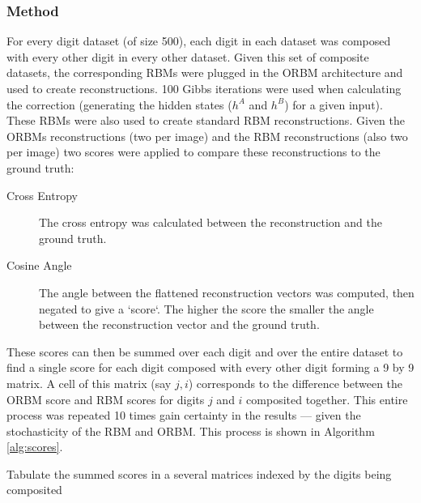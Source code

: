     \subsubsection{Method}

    For every digit dataset (of size 500), each digit in each dataset was composed with every other digit in every other dataset. Given this set of composite datasets, the corresponding RBMs were plugged in the ORBM architecture and used to create reconstructions. 100 Gibbs iterations were used when calculating the correction (generating the hidden states ($h^A$ and $h^B$) for a given input). These RBMs were also used to create standard RBM reconstructions.
    Given the ORBMs reconstructions (two per image) and the RBM reconstructions (also two per image) two scores were applied to compare these reconstructions to the ground truth:
    \begin{description}
      \item[Cross Entropy] The cross entropy was calculated between the reconstruction and the ground truth.
      \item[Cosine Angle] The angle between the flattened reconstruction vectors was computed, then negated to give a `score`. The higher the score the smaller the angle between the reconstruction vector and the ground truth.
    \end{description}
    These scores can then be summed over each digit and over the entire dataset to find a single score for each digit composed with every other digit forming a 9 by 9 matrix. A cell of this matrix (say $j,i$) corresponds to the difference between the ORBM score and RBM scores for digits $j$ and $i$ composited together. This entire process was repeated 10 times gain certainty in the results --- given the stochasticity of the RBM and ORBM. This process is shown in Algorithm \ref{alg:scores}.

    \begin{algorithm}[!ht]

      {
       Tabulate the summed scores in a several matrices indexed by the digits being composited\;
     }
    \caption{Algorithm explaining how the Scores matrices were constructed.}\label{alg:scores}
    \end{algorithm}

